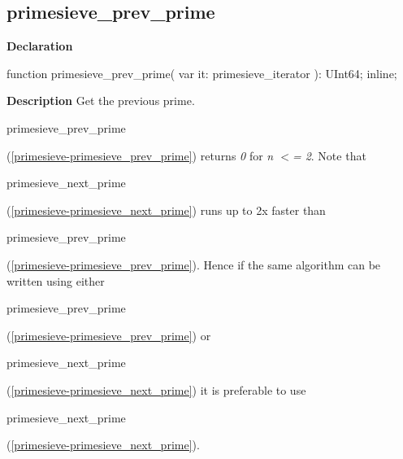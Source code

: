 \documentclass{report}
\newif\ifpdf
\begin{document}
\subsection*{primesieve{\_}prev{\_}prime}
\fi
\label{primesieve-primesieve_prev_prime}
\begin{list}{}{
\setlength{\itemindent}{0cm}
\setlength{\listparindent}{0cm}
\setlength{\leftmargin}{\evensidemargin}
\addtolength{\leftmargin}{\tmplength}
\settowidth{\labelsep}{X}
\addtolength{\leftmargin}{\labelsep}
\setlength{\labelwidth}{\tmplength}
}
\item[\textbf{Declaration}\hfill]
\ifpdf
\begin{flushleft}
\fi
\begin{ttfamily}
function primesieve{\_}prev{\_}prime( var it: primesieve{\_}iterator ): UInt64; inline;\end{ttfamily}

\ifpdf
\end{flushleft}
\fi

\par
\item[\textbf{Description}]
Get the previous prime.

\begin{ttfamily}primesieve{\_}prev{\_}prime\end{ttfamily}(\ref{primesieve-primesieve_prev_prime}) returns \textit{0} for \textit{n {$<$}= 2}. Note that \begin{ttfamily}primesieve{\_}next{\_}prime\end{ttfamily}(\ref{primesieve-primesieve_next_prime}) runs up to 2x faster than \begin{ttfamily}primesieve{\_}prev{\_}prime\end{ttfamily}(\ref{primesieve-primesieve_prev_prime}). Hence if the same algorithm can be written using either \begin{ttfamily}primesieve{\_}prev{\_}prime\end{ttfamily}(\ref{primesieve-primesieve_prev_prime}) or \begin{ttfamily}primesieve{\_}next{\_}prime\end{ttfamily}(\ref{primesieve-primesieve_next_prime}) it is preferable to use \begin{ttfamily}primesieve{\_}next{\_}prime\end{ttfamily}(\ref{primesieve-primesieve_next_prime}).

\end{list}
\ifpdf
\end{document}
